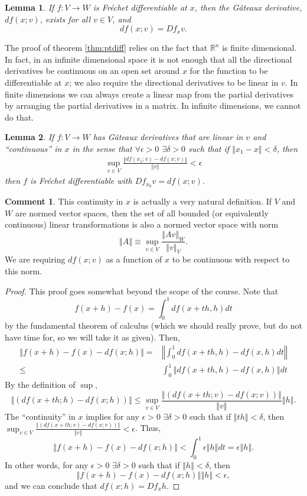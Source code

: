 \documentclass[12pt,reqno]{amsart}
\newtheorem{lemma}{Lemma}[section]
\theoremstyle{definition}
\newtheorem{remark}{Comment}[section]
\def\R{\mathbb{R}}
\newcommand{\norm}[1]{\left\Vert {#1} \right\Vert}
\renewcommand{\to}{{\rightarrow}}
\begin{document}
\begin{lemma}\label{lem:fregat}
  If $f: V \to W$ is Fr\'{e}chet differentiable at $x$, then the
  G\^{a}teaux derivative, $df(x;v)$, exists for all $v \in V$, and
  \[ df(x;v) = Df_x v. \]
\end{lemma}
The proof of theorem \ref{thm:ptdiff} relies on the fact that $\R^n$
is finite dimensional. In fact, in an infinite dimensional space it is
not enough that all the directional derivatives be continuous on an
open set around $x$ for the function to be differentiable at $x$; we
also require the directional derivatives to be linear in $v$. In
finite dimensions we can always create a linear map from the partial
derivatives by arranging the partial derivatives in a matrix. In
infinite dimensions, we cannot do that. 
\begin{lemma}\label{lem:gatfre}
  If $f: V \to W$ has G\^{a}teaux derivatives that are linear in $v$
  and ``continuous'' in $x$ in the sense that $\forall \epsilon>0$
  $\exists \delta > 0$ such that if $\norm{x_1 - x} < \delta$, then
  \begin{align*}
    \sup_{v \in V} \frac{\norm{df(x_1;v) - df(x;v)}}{\norm{v}} < \epsilon
  \end{align*}
  then $f$ is Fr\'{e}chet differentiable with $Df_{x_0} v = df(x;v)$.
\end{lemma}
\begin{remark}
  This continuity in $x$ is actually a very natural definition. If $V$
  and $W$ are normed vector spaces, then the set of all bounded (or
  equivalently continuous) linear transformations is also a normed
  vector space with norm 
  \[ \norm{A} \equiv \sup_{v \in V} \frac{\norm{Av}_W}{\norm{v}_V}. \]
  We are requiring $df(x;v)$ as a function of $x$ to be continuous with 
  respect to this norm. 
\end{remark}
\begin{proof}
  This proof goes somewhat beyond the scope of the course. Note that
  \[ f(x+h) - f(x) = \int_0^1 df(x+th,h) dt \]
  by the fundamental theorem of calculus (which we should really
  prove, but do not have time for, so we will take it as given). Then,
  \begin{align*}
    \norm{ f(x+h) - f(x) - df(x;h)} = & \norm{ \int_0^1 df(x+th,h) -
      df(x,h) dt} \\
    \leq & \int_0^1 \norm{df(x+th,h) -df(x,h)} dt
  \end{align*}
  By the definition of $\sup$, 
  \[ \norm{\left(df(x+th;h) - df(x;h) \right)} \leq \sup_{v \in V}
  \frac{\norm{\left(df(x+th;v) - df(x;v)
      \right)}}{\norm{v}}\norm{h}. \] 
  The ``continuity'' in $x$ implies for any $\epsilon>0$ $\exists
  \delta > 0$ such that if $\norm{th} < \delta$, then $\sup_{v \in V}
  \frac{\norm{\left(df(x+th;v) - df(x;v) \right)}}{\norm{v}} < \epsilon$.
  Thus,
  \[ 
  \norm{ f(x+h) - f(x) - df(x;h)} < \int_0^1 \epsilon \norm{h} dt =
  \epsilon \norm{h}. \]
  In other words, for any $\epsilon>0$ $\exists \delta>0$ such that
  if $\norm{h} < \delta$, then 
  \[ \norm{f(x+h) - f(x) - df(x;h)}{\norm{h}}< \epsilon, \]
  and we can conclude that $df(x;h) = Df_x h$. 
\end{proof}
\end{document}
